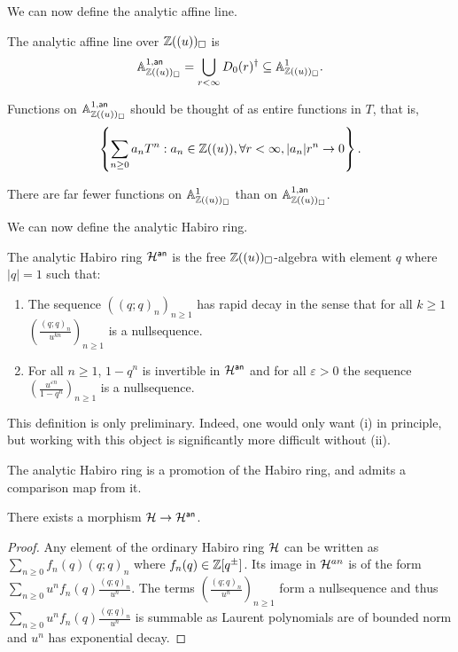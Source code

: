 We can now define the analytic affine line.
\begin{definition}\label{def: analytic affine line over analytic Habiro}
    The analytic affine line over $\mathbb{Z}((u))_{\square}$ is 
    $$\mathbb{A}^{1,\mathsf{an}}_{\mathbb{Z}((u))_{\square}}=\bigcup_{r<\infty}D_{0}(r)^{\dagger}\subseteq\mathbb{A}^{1}_{\mathbb{Z}((u))_{\square}}.$$
\end{definition}
Functions on $\mathbb{A}^{1,\mathsf{an}}_{\mathbb{Z}((u))_{\square}}$ should be thought of as entire functions in $T$, that is, 
$$\left\{\sum_{n\geq0}a_{n}T^{n}:a_{n}\in\mathbb{Z}((u)),\forall r<\infty, |a_{n}|r^{n}\to0\right\}.$$
\begin{remark}
    There are far fewer functions on $\mathbb{A}^{1}_{\mathbb{Z}((u))_{\square}}$ than on $\mathbb{A}^{1,\mathsf{an}}_{\mathbb{Z}((u))_{\square}}$. 
\end{remark}
We can now define the analytic Habiro ring. 
\begin{definition}\label{def: analytic Habiro ring}
    The analytic Habiro ring $\mathcal{H}^{\mathsf{an}}$ is the free $\mathbb{Z}((u))_{\square}$-algebra with element $q$ where $|q|=1$ such that:
    \begin{enumerate}[label=(\roman*)]
        \item The sequence $((q;q)_{n})_{n\geq1}$ has rapid decay in the sense that for all $k\geq 1$ $\left(\frac{(q;q)_{n}}{u^{kn}}\right)_{n\geq1}$ is a nullsequence. 
        \item For all $n\geq 1$, $1-q^{n}$ is invertible in $\mathcal{H}^{\mathsf{an}}$ and for all $\varepsilon>0$ the sequence $\left(\frac{u^{\varepsilon n}}{1-q^{n}}\right)_{n\geq1}$ is a nullsequence. 
    \end{enumerate}
\end{definition}
\begin{remark}
    This definition is only preliminary. Indeed, one would only want (i) in principle, but working with this object is significantly more difficult without (ii). 
\end{remark}
\begin{remark}
\end{remark}
The analytic Habiro ring is a promotion of the Habiro ring, and admits a comparison map from it. 
\begin{lemma}\label{lem: map from Habiro to analytic Habiro}
    There exists a morphism $\mathcal{H}\to\mathcal{H}^{\mathsf{an}}$. 
\end{lemma}
\begin{proof}
    Any element of the ordinary Habiro ring $\mathcal{H}$ can be written as $\sum_{n\geq0}f_{n}(q)(q;q)_{n}$ where $f_{n}(q)\in\mathbb{Z}[q^{\pm}]$. Its image in $\mathcal{H}^{an}$ is of the form $\sum_{n\geq0}u^{n}f_{n}(q)\frac{(q;q)_{n}}{u^{n}}$. The terms $\left(\frac{(q;q)_{n}}{u^{n}}\right)_{n\geq1}$ form a nullsequence and thus $\sum_{n\geq0}u^{n}f_{n}(q)\frac{(q;q)_{n}}{u^{n}}$ is summable as Laurent polynomials are of bounded norm and $u^{n}$ has exponential decay. 
\end{proof}
